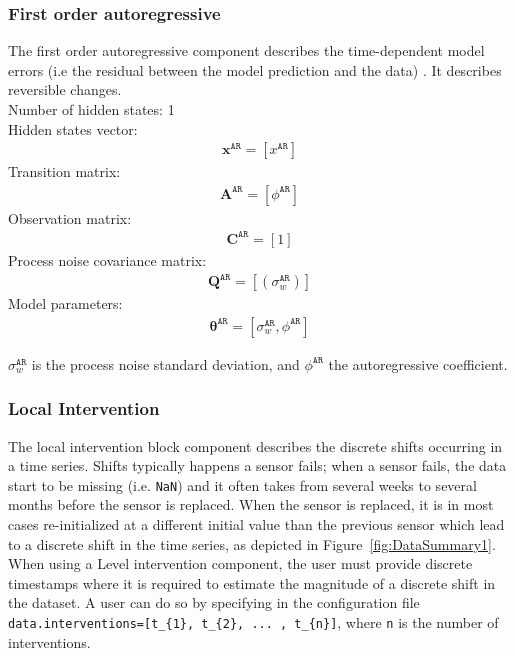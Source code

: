 \subsubsection{First order autoregressive}

The first order autoregressive component describes the time-dependent model errors (i.e the residual between the model prediction and the data) \cite{STC:STC2035}. 
It describes reversible changes.\\

\noindent
Number of hidden states: 1\\

Hidden states vector: 
\begin{gather*}
\mathbf{x}^{\mathtt{AR}} = [x^{\mathtt{AR}}]
\end{gather*}
Transition matrix: 
\begin{gather*}
\mathbf{A}^{\mathtt{AR}}=  [\phi^{\mathtt{AR}}]
\end{gather*}
Observation matrix: 
\begin{gather*}
\mathbf{C}^{\mathtt{AR}}=[1]
\end{gather*}
Process noise covariance matrix: 
\begin{gather*}
\mathbf{Q}^{\mathtt{AR}}=[(\sigma_{w}^{\mathtt{AR}})]
\end{gather*}
Model parameters: 
\begin{gather*}
\bm\theta^{\mathtt{AR}}=[\sigma_{w}^{\mathtt{AR}}, \phi^{\mathtt{AR}} ]
\end{gather*}

\noindent
$\sigma_{w}^{\mathtt{AR}}$ is the process noise standard deviation, and $\phi^{\mathtt{AR}}$ the autoregressive coefficient.

\subsubsection{Local Intervention}\label{SSS:LI}

The local intervention block component describes the discrete shifts occurring in a time series. Shifts typically happens a sensor fails; when a sensor fails, the data start to be missing (i.e. \lstinline[basicstyle = \mlttfamily \small, backgroundcolor = \color{light-gray}]!NaN!) and it often takes from several weeks to several months before the sensor is replaced. When the sensor is replaced, it is in most cases re-initialized at a different initial value than the previous sensor which lead to a discrete shift in the time series, as depicted in Figure~\ref{fig:DataSummary1}. When using a Level intervention component, the user must provide discrete timestamps where it is required to estimate the magnitude of a discrete shift in the dataset. A user can do so by specifying in the configuration file \lstinline[basicstyle = \mlttfamily \small, backgroundcolor = \color{light-gray}]!data.interventions=[t_{1}, t_{2}, ... , t_{n}]!, where \lstinline[basicstyle = \mlttfamily \small, backgroundcolor = \color{light-gray}]!n! is the number of interventions. 


